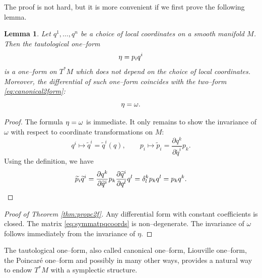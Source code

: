 \documentclass[english,fontsize=11pt,paper=a5,oneside]{scrbook}
\let\d\relax
\newcommand{\d}{\mathrm{d}}
\newtheorem{lemma}[theorem]{Lemma}
\theoremstyle{definition}
\begin{document}
The proof is not hard, but it is more convenient if we first prove the following lemma.
\begin{lemma}
  Let $q^1, \ldots, q^n$ be a choice of local coordinates on a smooth manifold $M$. Then the \emph{tautological one--form}
  \begin{equation}
    \eta = p_i \d q^i
  \end{equation}
  is a one--form on $T^* M$ which does not depend on the choice of local coordinates.
  Moreover, the differential of such one--form coincides with the two--form \eqref{eq:canonical2form}:
  \begin{equation}
    \d \eta = \omega.
  \end{equation}
\end{lemma}

\begin{proof}
  The formula $\d \eta = \omega$ is immediate.
  It only remains to show the invariance of $\omega$ with respect to coordinate transformations on $M$:
  \begin{equation}
    q^i \mapsto \widetilde q^i = \widetilde q^i(q), \qquad
    p_i \mapsto \widetilde p_i = \frac{\partial q^k}{\partial \widetilde q^i} p_k.
  \end{equation}
  Using the definition, we have
  \begin{equation}
    \widetilde p_i \d \widetilde q^i =
    \frac{\partial q^k}{\partial \widetilde q^i} p_k \frac{\partial \widetilde q^i}{\partial q^l} \d q^l
    = \delta^k_l p_k \d q^l
    = p_k \d q^k.
  \end{equation}
\end{proof}

\begin{proof}[Proof of Theorem \ref{thm:propc2f}]
  Any differential form with constant coefficients is closed.
  The matrix \eqref{eq:symmatpqcoords} is non--degenerate.
  The invariance of $\omega$ follows immediately from the invariance of $\eta$.
\end{proof}

The tautological one--form, also called canonical one--form, Liouville one--form, the Poincar\'e one--form and possibly in many other ways, provides a natural way to endow $T^*M$ with a symplectic structure.
\end{document}
